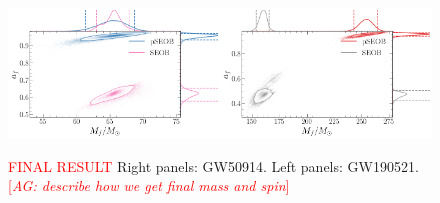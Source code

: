 \documentclass[twocolumn,prd,superscriptaddress,amsfonts,amssymb,amsmath,preprintnumbers]{revtex4-1}
\newcommand{\abhi}[1]{\textcolor{red}{[\textit{AG: #1}]}}
\begin{document}
\begin{figure}[h!]
	\includegraphics[width=0.5\textwidth]{figures/GW150914_simulated_signal_0p5_gr_ngr_Mfaf.png}\includegraphics[width=0.5\textwidth]{figures/GW190521_simulated_signal_0p5_gr_ngr_Mfaf.png}
	\caption{\textcolor{red}{FINAL RESULT} Right panels: GW50914. Left panels: GW190521. \abhi{describe how we get final mass and spin}}
	\label{fig:gr_ngr_comparison}
\end{figure}


%


\end{document}
